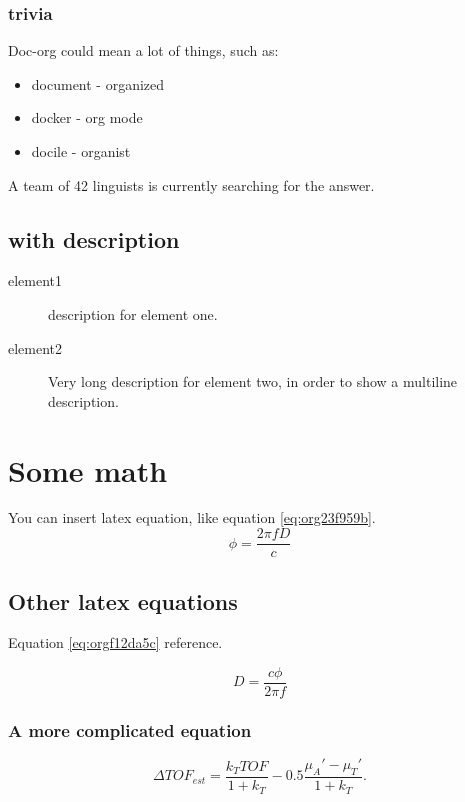 \subsubsection{trivia}
\label{sec:orgb0faa85}
Doc-org could mean a lot of things, such as:
\begin{itemize}
\item document - organized
\item docker - org mode
\item docile - organist
\end{itemize}
A team of 42 linguists is currently searching for the answer.
\subsection{with description}
\label{sec:org4716a9e}
\begin{description}
\item[{element1}] description for element one.
\item[{element2}] Very long description for element two, in order to show a
multiline description.
\end{description}

\section{Some math}
\label{sec:org59a0164}
You can insert latex equation, like equation \ref{eq:org23f959b}.
\begin{equation}
\label{eq:org23f959b}
\phi = \frac{2\pi fD}{c}
\end{equation}
\subsection{Other latex equations}
\label{sec:org6cb5280}
Equation \ref{eq:orgf12da5c} reference.

\begin{equation}
\label{eq:orgf12da5c}
D = \frac{c\phi}{2\pi f}
\end{equation}

\subsubsection{A more complicated equation}
\label{sec:org9dc5305}

\begin{equation}
\Delta TOF_{est} = \frac{k_T TOF}{1+k_T } - 0.5 \frac{\mu_A' - \mu_T'}{1+k_T}.
\end{equation}

